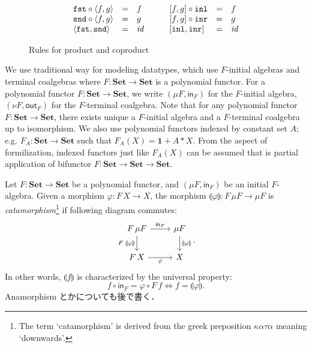 \documentclass[runningheads, orivec]{llncs}
\begin{document}
\begin{figure}[t]
\[
\begin{array}{lllclll}
\verb~fst~ \circ \langle f, g \rangle &=& f &\quad& {} [f, g] \circ \verb~inl~ &=& f \\
\verb~snd~ \circ \langle f, g \rangle &=& g && {} [f, g] \circ \verb~inr~ &=& g \\
\langle \verb~fst~, \verb~snd~ \rangle &=& \mathit{id} && [\verb~inl~, \verb~inr~] &=& \mathit{id}
\end{array}
\]

\caption{Rules for product and coproduct}
\end{figure}

We use traditional way for modeling datatypes, which use \( F \)-initial algebras and terminal coalgebras where \( F : \mathbf{Set} \to \mathbf{Set} \) is a polynomial functor. For a polynomial functor \( F : \mathbf{Set} \to \mathbf{Set} \), we write \( ( \mu F , \mathsf{in}_F ) \) for the \( F \)-initial algebra, \( (\nu F , \mathsf{out}_F ) \) for the \( F \)-terminal coalgebra. Note that for any polynomial functor \( F : \mathbf{Set} \to \mathbf{Set} \), there exists unique a \( F \)-initial algebra and a \( F \)-terminal coalgebra up to isomorphism. We also use polynomial functors indexed by constant set \( A \); e.g. \( F_A : \mathbf{Set} \to \mathbf{Set} \) such that \( F_A(X) = \mathbf{1} + A * X \). From the aspect of formilization, indexed functors just like \( F_A(X) \) can be assumed that is partial application of bifunctor \( F : \mathbf{Set} \to \mathbf{Set} \to \mathbf{Set} \).

Let \( F \colon \mathbf{Set} \to \mathbf{Set} \) be a polynomial functor, and \( (\mu F, \mathsf{in}_F) \) be an initial \( F \)-algebra. Given a morphism \( \varphi \colon F\,X \to X \), the morphism \( \llparenthesis \varphi \rrparenthesis \colon F\,\mu F \to \mu F \) is \emph{catamorphism}\footnote{The term `catamorphism' is derived from the greek preposition \(\mathit{\kappa\alpha\tau\alpha}\) meaning `downwards'.} if following diagram commutes:
\[
\begin{tikzcd}
F\,\mu F \ar[d, "{F\;\llparenthesis \varphi \rrparenthesis}"']\ar[r, "{\mathsf{in}_F}"] & \mu F \ar[d, "{\llparenthesis \varphi \rrparenthesis}"] \\
F\,X \ar[r, "{\varphi}"'] & X
\end{tikzcd}.
\]
In other words, \( \llparenthesis f \rrparenthesis \) is characterized by the universal property:
\[
f \circ \mathsf{in}_F = \varphi \circ F\,f \iff f = \llparenthesis \varphi \rrparenthesis .
\]
Anamorphism とかについても後で書く．
\end{document}

